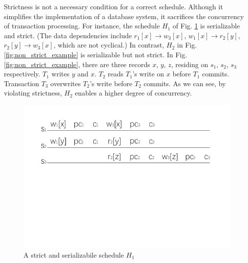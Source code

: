 \documentclass[conference]{IEEEtran}
\begin{document}
Strictness is not a necessary condition for a correct schedule.
Although it simplifies the implementation of a database system, it sacrifices the concurrency of transaction processing.
For instance, the schedule ${H_1}$ of Fig.    \ref{fig:strict_example} is serializable and strict. %
(The data dependencies include ${r_1[x] \rightarrow w_3[x]}$, ${w_1[x] \rightarrow r_2[y]}$, ${r_2[y] \rightarrow w_3[x]}$, which are not cyclical.)
In contrast, ${H_2}$ in Fig.    \ref{fig:non_strict_example} is serializable but not strict.
In Fig.    \ref{fig:non_strict_example}, there are three records ${x}$, ${y}$, ${z}$, residing on ${s_1}$, ${s_2}$, ${s_3}$ respectively.
${T_1}$ writes ${y}$ and ${x}$.
${T_2}$ reads ${T_1}$'s write on ${x}$ before ${T_1}$ commits.
Transaction ${T_3}$ overwrites ${T_2}$'s write before ${T_2}$ commits.
As we can see, by violating strictness, ${H_2}$  enables a higher degree of concurrency.

%
%




\begin{figure}[htbp]
  \centerline{\includegraphics[scale=1]{figure/schedule_strict.pdf}}
  \caption{A strict and serializabile schedule ${H_1}$}
  \label{fig:strict_example}
\end{figure}
\end{document}
